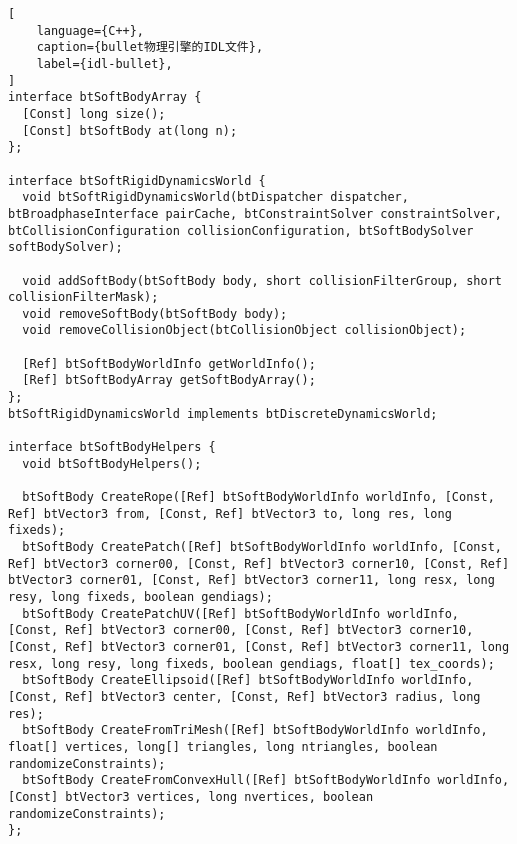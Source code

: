\begin{lstlisting}[
    language={C++},
    caption={bullet物理引擎的IDL文件},
    label={idl-bullet},
]
interface btSoftBodyArray {
  [Const] long size();
  [Const] btSoftBody at(long n);
};

interface btSoftRigidDynamicsWorld {
  void btSoftRigidDynamicsWorld(btDispatcher dispatcher, btBroadphaseInterface pairCache, btConstraintSolver constraintSolver, btCollisionConfiguration collisionConfiguration, btSoftBodySolver softBodySolver);

  void addSoftBody(btSoftBody body, short collisionFilterGroup, short collisionFilterMask);
  void removeSoftBody(btSoftBody body);
  void removeCollisionObject(btCollisionObject collisionObject);

  [Ref] btSoftBodyWorldInfo getWorldInfo();
  [Ref] btSoftBodyArray getSoftBodyArray();
};
btSoftRigidDynamicsWorld implements btDiscreteDynamicsWorld;

interface btSoftBodyHelpers {
  void btSoftBodyHelpers();

  btSoftBody CreateRope([Ref] btSoftBodyWorldInfo worldInfo, [Const, Ref] btVector3 from, [Const, Ref] btVector3 to, long res, long fixeds);
  btSoftBody CreatePatch([Ref] btSoftBodyWorldInfo worldInfo, [Const, Ref] btVector3 corner00, [Const, Ref] btVector3 corner10, [Const, Ref] btVector3 corner01, [Const, Ref] btVector3 corner11, long resx, long resy, long fixeds, boolean gendiags);
  btSoftBody CreatePatchUV([Ref] btSoftBodyWorldInfo worldInfo, [Const, Ref] btVector3 corner00, [Const, Ref] btVector3 corner10, [Const, Ref] btVector3 corner01, [Const, Ref] btVector3 corner11, long resx, long resy, long fixeds, boolean gendiags, float[] tex_coords);
  btSoftBody CreateEllipsoid([Ref] btSoftBodyWorldInfo worldInfo, [Const, Ref] btVector3 center, [Const, Ref] btVector3 radius, long res);
  btSoftBody CreateFromTriMesh([Ref] btSoftBodyWorldInfo worldInfo, float[] vertices, long[] triangles, long ntriangles, boolean randomizeConstraints);
  btSoftBody CreateFromConvexHull([Ref] btSoftBodyWorldInfo worldInfo, [Const] btVector3 vertices, long nvertices, boolean randomizeConstraints);
};

\end{lstlisting}